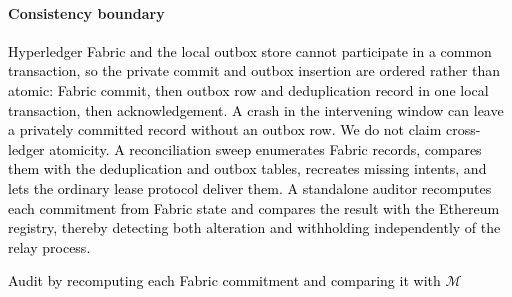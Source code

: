 \documentclass[final,5p,times,twocolumn]{elsarticle}
\begin{document}
\paragraph*{\textbf{Consistency boundary}}
\textcolor{black}{Hyperledger Fabric and the local outbox store cannot participate in a common transaction, so the private commit and outbox insertion are ordered rather than atomic: Fabric commit, then outbox row and deduplication record in one local transaction, then acknowledgement. A crash in the intervening window can leave a privately committed record without an outbox row. We do not claim cross-ledger atomicity. A reconciliation sweep enumerates Fabric records, compares them with the deduplication and outbox tables, recreates missing intents, and lets the ordinary lease protocol deliver them. A standalone auditor recomputes each commitment from Fabric state and compares the result with the Ethereum registry, thereby detecting both alteration and withholding independently of the relay process.}

\begin{algorithm}[!htbp]
\scriptsize
\color{black}
\caption{\textcolor{black}{Pseudocode for lease-coordinated relay delivery and reconciliation}}
\label{alg:relay}
\KwResult{\textcolor{black}{One durable public effect for every publishable committed record}}
\textcolor{black}{Audit by recomputing each Fabric commitment and comparing it with $\mathcal{M}$}\;
\end{algorithm}
\end{document}
